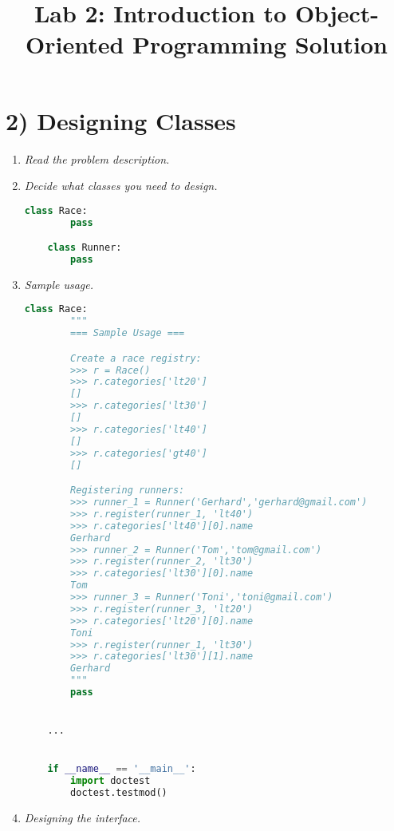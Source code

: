 \documentclass[12pt]{article}
\begin{document}
\title{Lab 2: Introduction to Object-Oriented Programming Solution}
\date{}
\maketitle

\section*{2) Designing Classes}
\begin{enumerate}[1.]
\item \textit{Read the problem description.}
\item \textit{Decide what classes you need to design.}

\begin{lstlisting}[language=Python]
    class Race:
        pass

    class Runner:
        pass
\end{lstlisting}

\item \textit{Sample usage.}

\begin{lstlisting}[language=Python]
    class Race:
        """
        === Sample Usage ===

        Create a race registry:
        >>> r = Race()
        >>> r.categories['lt20']
        []
        >>> r.categories['lt30']
        []
        >>> r.categories['lt40']
        []
        >>> r.categories['gt40']
        []

        Registering runners:
        >>> runner_1 = Runner('Gerhard','gerhard@gmail.com')
        >>> r.register(runner_1, 'lt40')
        >>> r.categories['lt40'][0].name
        Gerhard
        >>> runner_2 = Runner('Tom','tom@gmail.com')
        >>> r.register(runner_2, 'lt30')
        >>> r.categories['lt30'][0].name
        Tom
        >>> runner_3 = Runner('Toni','toni@gmail.com')
        >>> r.register(runner_3, 'lt20')
        >>> r.categories['lt20'][0].name
        Toni
        >>> r.register(runner_1, 'lt30')
        >>> r.categories['lt30'][1].name
        Gerhard
        """
        pass


    ...


    if __name__ == '__main__':
        import doctest
        doctest.testmod()

\end{lstlisting}

\item \textit{Designing the interface.}

\end{enumerate}
\end{document}
